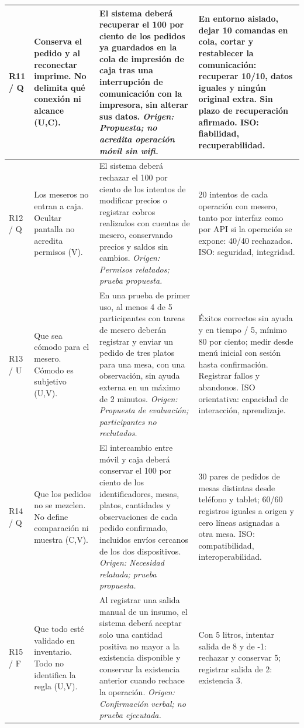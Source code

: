 \documentclass[11pt,a4paper]{article}
\begin{document}
\begin{longtable}{|L{1.1cm}|L{3.2cm}|L{6.2cm}|L{4.7cm}|}
R11 / Q & Conserva el pedido y al reconectar imprime. No delimita qué conexión ni alcance (U,C). & El sistema deberá recuperar el 100 por ciento de los pedidos ya guardados en la cola de impresión de caja tras una interrupción de comunicación con la impresora, sin alterar sus datos. \textit{Origen: Propuesta; no acredita operación móvil sin wifi.} & En entorno aislado, dejar 10 comandas en cola, cortar y restablecer la comunicación: recuperar 10/10, datos iguales y ningún original extra. Sin plazo de recuperación afirmado. ISO: fiabilidad, recuperabilidad. \\ \hline
R12 / Q & Los meseros no entran a caja. Ocultar pantalla no acredita permisos (V). & El sistema deberá rechazar el 100 por ciento de los intentos de modificar precios o registrar cobros realizados con cuentas de mesero, conservando precios y saldos sin cambios. \textit{Origen: Permisos relatados; prueba propuesta.} & 20 intentos de cada operación con mesero, tanto por interfaz como por API si la operación se expone: 40/40 rechazados. ISO: seguridad, integridad. \\ \hline
R13 / U & Que sea cómodo para el mesero. Cómodo es subjetivo (U,V). & En una prueba de primer uso, al menos 4 de 5 participantes con tareas de mesero deberán registrar y enviar un pedido de tres platos para una mesa, con una observación, sin ayuda externa en un máximo de 2 minutos. \textit{Origen: Propuesta de evaluación; participantes no reclutados.} & Éxitos correctos sin ayuda y en tiempo / 5, mínimo 80 por ciento; medir desde menú inicial con sesión hasta confirmación. Registrar fallos y abandonos. ISO orientativa: capacidad de interacción, aprendizaje. \\ \hline
R14 / Q & Que los pedidos no se mezclen. No define comparación ni muestra (C,V). & El intercambio entre móvil y caja deberá conservar el 100 por ciento de los identificadores, mesas, platos, cantidades y observaciones de cada pedido confirmado, incluidos envíos cercanos de los dos dispositivos. \textit{Origen: Necesidad relatada; prueba propuesta.} & 30 pares de pedidos de mesas distintas desde teléfono y tablet; 60/60 registros iguales a origen y cero líneas asignadas a otra mesa. ISO: compatibilidad, interoperabilidad. \\ \hline
R15 / F & Que todo esté validado en inventario. Todo no identifica la regla (U,V). & Al registrar una salida manual de un insumo, el sistema deberá aceptar solo una cantidad positiva no mayor a la existencia disponible y conservar la existencia anterior cuando rechace la operación. \textit{Origen: Confirmación verbal; no prueba ejecutada.} & Con 5 litros, intentar salida de 8 y de -1: rechazar y conservar 5; registrar salida de 2: existencia 3. \\ \hline
\end{longtable}
\endgroup
\end{document}
